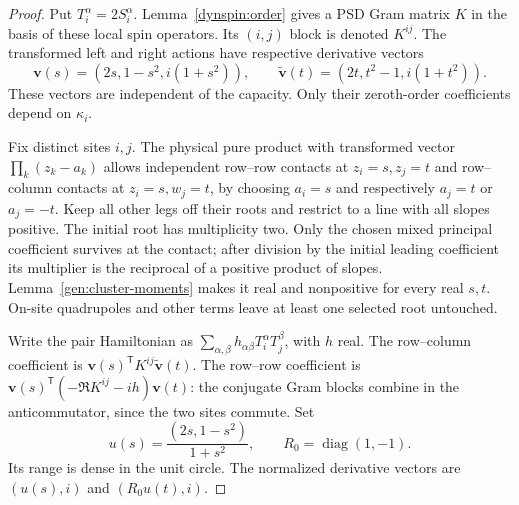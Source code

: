 \documentclass[reqno]{amsart}
\theoremstyle{definition}
\theoremstyle{remark}
\DeclareMathOperator{\diag}{diag}
\begin{document}
\begin{proof}
Put $T_i^\alpha=2S_i^\alpha$.  Lemma~\ref{dynspin:order} gives a PSD
Gram matrix $K$ in the basis of these local spin operators.  Its
$(i,j)$ block is denoted $K^{ij}$.  The transformed left and right
actions have respective derivative vectors
\begin{equation}\label{dynspin:vectors}
 \mathbf v(s)=(2s,1-s^2,i(1+s^2)),\qquad
 \widetilde{\mathbf v}(t)=(2t,t^2-1,i(1+t^2)).
\end{equation}
These vectors are independent of the capacity.  Only their zeroth-order
coefficients depend on $\kappa_i$.

Fix distinct sites $i,j$.  The physical pure product with transformed
vector $\prod_k(z_k-a_k)$ allows independent row--row contacts at
$z_i=s,z_j=t$ and row--column contacts at $z_i=s,w_j=t$, by choosing
$a_i=s$ and respectively $a_j=t$ or $a_j=-t$.  Keep all other legs
off their roots and restrict to a line with all slopes positive.
The initial root has multiplicity two.  Only the chosen mixed
principal coefficient survives at the contact; after division by the
initial leading coefficient its multiplier is the reciprocal of a
positive product of slopes.  Lemma~\ref{gen:cluster-moments} makes it
real and nonpositive for every real $s,t$.  On-site quadrupoles and
other terms leave at least one selected root untouched.

Write the pair Hamiltonian as
$\sum_{\alpha,\beta}h_{\alpha\beta}T_i^\alpha T_j^\beta$, with $h$
real.  The row--column coefficient is
$\mathbf v(s)^{\mathsf T}K^{ij}\widetilde{\mathbf v}(t)$.
The row--row coefficient is
$\mathbf v(s)^{\mathsf T}(-\Re K^{ij}-ih)\mathbf v(t)$: the conjugate Gram blocks
combine in the anticommutator, since the two sites commute.
Set
\[
 u(s)=\frac{(2s,1-s^2)}{1+s^2},\qquad R_0=\diag(1,-1).
\]
Its range is dense in the unit circle.  The normalized derivative
vectors are $(u(s),i)$ and $(R_0u(t),i)$.


\end{proof}
\end{document}
